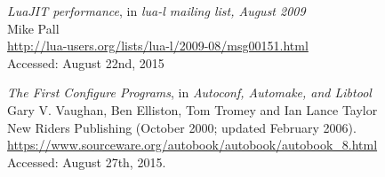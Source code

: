 \begin{thebibliography}{99}
		\emph{LuaJIT performance}, in \emph{lua-l mailing list, August 2009} \\
		Mike Pall \\
		\url{http://lua-users.org/lists/lua-l/2009-08/msg00151.html} \\
		Accessed: August 22nd, 2015

		\emph{The First Configure Programs},
		in \emph{Autoconf, Automake, and Libtool} \\
		Gary V. Vaughan, Ben Elliston, Tom Tromey and Ian Lance Taylor \\
		New Riders Publishing (October 2000; updated February 2006). \\
		\url{https://www.sourceware.org/autobook/autobook/autobook_8.html} \\
		Accessed: August 27th, 2015.

\end{thebibliography}

